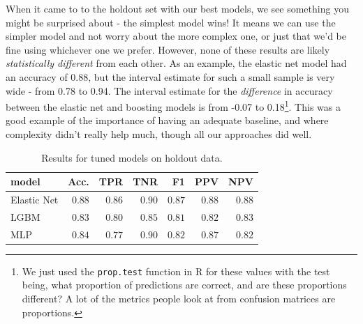 \documentclass[
  letterpaper,
]{krantz}
\begin{document}
When it came to to the holdout set with our best models, we see
something you might be surprised about - the simplest model wins! It
means we can use the simpler model and not worry about the more complex
one, or just that we'd be fine using whichever one we prefer. However,
none of these results are likely \emph{statistically different} from
each other. As an example, the elastic net model had an accuracy of
0.88, but the interval estimate for such a small sample is very wide -
from 0.78 to 0.94. The interval estimate for the \emph{difference} in
accuracy between the elastic net and boosting models is from -0.07 to
0.18\footnote{We just used the \texttt{prop.test} function in R for
  these values with the test being, what proportion of predictions are
  correct, and are these proportions different? A lot of the metrics
  people look at from confusion matrices are proportions.}. This was a
good example of the importance of having an adequate baseline, and where
complexity didn't really help much, though all our approaches did well.

\hypertarget{tbl-benchmark-r}{}
\begin{longtable}{lrrrrrr}
\caption{\label{tbl-benchmark-r}Results for tuned models on holdout data. }\tabularnewline

\toprule
model & Acc. & TPR & TNR & F1 & PPV & NPV \\ 
\midrule\addlinespace[2.5pt]
Elastic Net & \textcolor[HTML]{404040}{$0.88$} & \textcolor[HTML]{404040}{$0.86$} & \textcolor[HTML]{404040}{$0.90$} & \textcolor[HTML]{404040}{$0.87$} & \textcolor[HTML]{404040}{$0.88$} & \textcolor[HTML]{404040}{$0.88$} \\ 
LGBM & \textcolor[HTML]{404040}{$0.83$} & \textcolor[HTML]{404040}{$0.80$} & \textcolor[HTML]{404040}{$0.85$} & \textcolor[HTML]{404040}{$0.81$} & \textcolor[HTML]{404040}{$0.82$} & \textcolor[HTML]{404040}{$0.83$} \\ 
MLP & \textcolor[HTML]{404040}{$0.84$} & \textcolor[HTML]{404040}{$0.77$} & \textcolor[HTML]{404040}{$0.90$} & \textcolor[HTML]{404040}{$0.82$} & \textcolor[HTML]{404040}{$0.87$} & \textcolor[HTML]{404040}{$0.82$} \\ 
\bottomrule
\end{longtable}
\end{document}
